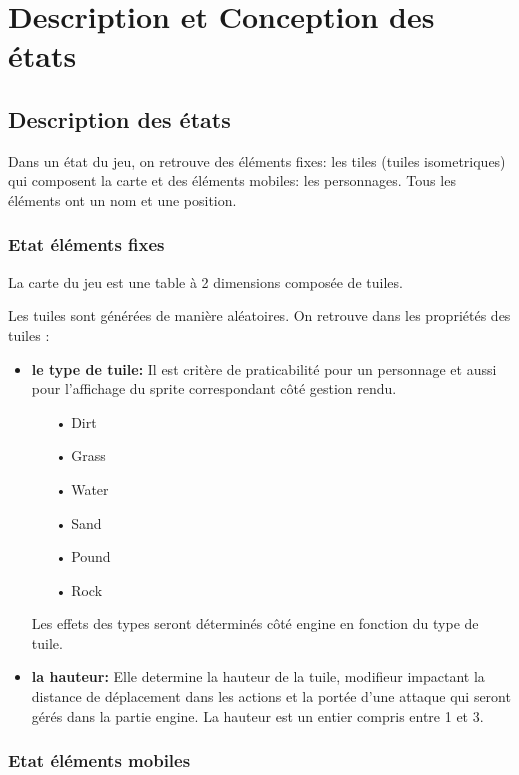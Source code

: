 \chapter{Description et Conception des états}


\section{Description des états}

Dans un état du jeu, on retrouve des éléments fixes: les tiles (tuiles isometriques) qui composent la carte et des éléments mobiles: les personnages. Tous les éléments ont un nom et une position.

\subsection{Etat éléments fixes}

La carte du jeu est une table à 2 dimensions composée de tuiles.

Les tuiles sont générées de manière aléatoires. 
On retrouve dans les propriétés des tuiles : 
\\

\begin{itemize}
    \item \textbf{le type de tuile:} Il est critère de praticabilité pour un personnage et aussi pour l'affichage du sprite correspondant côté gestion rendu.
       \begin{itemize}
         \item[•]  Dirt
         \item[•]  Grass
         \item[•]  Water
         \item[•]  Sand
         \item[•]  Pound
         \item[•]  Rock
         \\
       \end{itemize}
    Les effets des types seront déterminés côté engine en fonction du type de tuile.
    \\
    \item \textbf{la hauteur:} Elle determine la hauteur de la tuile, modifieur impactant la distance de déplacement dans les actions et la portée d'une attaque qui seront gérés dans la partie engine. La hauteur est un entier compris entre 1 et 3.
\end{itemize}

\subsection{Etat éléments mobiles}

